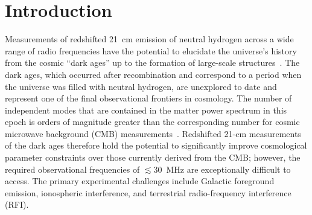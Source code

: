 \documentclass{ws-jai}
\def\albatros{ALBATROS}
\begin{document}
\begin{abstract}
Measurements of redshifted 21-cm emission of neutral hydrogen at
$\lesssim30$~MHz have the potential to probe the cosmic ``dark ages,''
a period of the universe's history that remains unobserved to date.
Observations at these frequencies are exceptionally challenging
because of bright Galactic foregrounds, ionospheric contamination, and
terrestrial radio-frequency interference.  Very few sky maps exist at
$\lesssim30$~MHz, and most have modest resolution.  We introduce the
Array of Long Baseline Antennas for Taking Radio Observations from the
Sub-Antarctic (\albatros), a new experiment that aims to image
low-frequency Galactic emission with an order-of-magnitude improvement
in resolution over existing data.  The \albatros\ array will consist
of antenna stations that operate autonomously, each recording baseband
data that will be interferometrically combined offline.  The array
will be installed on Marion Island and will ultimately comprise 10
stations, with an operating frequency range of 1.2--125~MHz and
maximum baseline lengths of $\sim20$~km.  We present the
\albatros\ instrument design and discuss pathfinder observations that
were taken from Marion Island during 2018--2019.
\end{abstract}


\section{Introduction}

Measurements of redshifted \SI{21}{\cm} emission of neutral hydrogen
across a wide range of radio frequencies have the potential to
elucidate the universe's history from the cosmic ``dark ages'' up to
the formation of large-scale
structures~\citep[e.g.,][]{2012RPPh...75h6901P}.  The dark ages, which
occurred after recombination and correspond to a period when the
universe was filled with neutral hydrogen, are unexplored to date and
represent one of the final observational frontiers in cosmology.  The
number of independent modes that are contained in the matter power
spectrum in this epoch is orders of magnitude greater than the
corresponding number for cosmic microwave background (CMB)
measurements~\citep{2004PhRvL..92u1301L}.  Redshifted 21-cm
measurements of the dark ages therefore hold the potential to
significantly improve cosmological parameter constraints over those
currently derived from the CMB; however, the required observational
frequencies of $\lesssim 30$~MHz are exceptionally difficult to
access.  The primary experimental challenges include Galactic
foreground emission, ionospheric interference, and terrestrial
radio-frequency interference (RFI).
\end{document}
